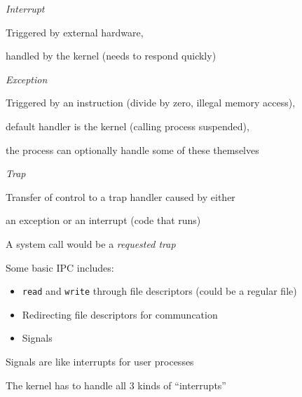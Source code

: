   \begin{slide}


    \textit{Interrupt}

    \leftspace{}Triggered by external hardware,

    \leftspace{}handled by the kernel (needs to respond quickly)
    \bigskip

    \textit{Exception}

    \leftspace{}Triggered by an instruction (divide by zero, illegal memory
                  access),

    \leftspace{}default handler is the kernel (calling process suspended),

    \leftspace{}the process can optionally handle some of these themselves
    \bigskip

    \textit{Trap}

    \leftspace{}Transfer of control to a trap handler caused by either

    \leftspace{}an exception or an interrupt (code that runs)
    \medskip

    A system call would be a \textit{requested trap}
  \end{slide}

  \begin{slide}


    Some basic IPC includes:
    \begin{itemize}
      \item \texttt{read} and \texttt{write} through file descriptors (could be a regular file)
      \item Redirecting file descriptors for communcation
      \item Signals
    \end{itemize}
    \medskip

    Signals are like interrupts for user processes

    \leftspace{}The kernel has to handle all 3 kinds of ``interrupts''

  \end{slide}


